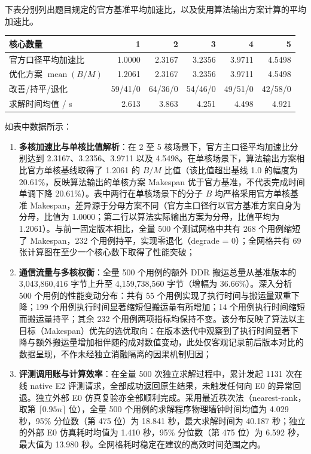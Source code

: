 \documentclass[anonymous,notoc]{gmcm2026}
\providecommand{\tightlist}{\setlength{\itemsep}{0pt}\setlength{\parskip}{0pt}}
\begin{document}
下表分别列出题目规定的官方基准平均加速比，以及使用算法输出方案计算的平均加速比。

\begin{table}[!htbp]\centering\small

\begin{tabularx}{\linewidth}{@{}Xrrrrr@{}}\toprule
核心数量 & 1 & 2 & 3 & 4 & 5 \\
\midrule
官方口径平均加速比 & 1.0000 & 2.3167 & 3.2356 & 3.9711 & 4.5498 \\
优化方案 $\operatorname{mean}(B/M)$ & 1.2061 & 2.3167 & 3.2356 & 3.9711 & 4.5498 \\
改善/持平/退化 & 59/41/0 & 64/36/0 & 54/46/0 & 49/51/0 & 42/58/0 \\
求解时间均值 / s & 2.613 & 3.863 & 4.251 & 4.498 & 4.921 \\
\bottomrule\end{tabularx}\end{table}

如表中数据所示：

\begin{enumerate}
\def\labelenumi{\arabic{enumi}.}
\tightlist
\item
  \textbf{多核加速比与单核比值解析}：在 2 至 5 核场景下，官方主口径平均加速比分别达到 2.3167、3.2356、3.9711 以及 4.5498。在单核场景下，算法输出方案相比官方单核基线取得了 1.2061 的 \(B/M\) 比值（该比值超出基线 1.0 的幅度为 20.61\%，反映算法输出的单核方案 Makespan 优于官方基准，不代表完成时间单调下降 20.61\%）。表中两行在单核场景下的分子 \(B\) 均严格采用官方单核基准 Makespan，差异源于分母方案不同（官方主口径行以官方基准方案自身为分母，比值为 1.0000；第二行以算法实际输出方案为分母，比值平均为 1.2061）。与前一固定版本相比，全量 500 个测试网格中共有 268 个用例缩短了 Makespan，232 个用例持平，实现零退化（degrade = 0）；全网格共有 69 张计算图在至少一个核心数下取得了性能突破；
\item
  \textbf{通信流量与多核权衡}：全量 500 个用例的额外 DDR 搬运总量从基准版本的 3,043,860,416 字节上升至 4,159,738,560 字节（增幅为 36.66\%）。深入分析 500 个用例的性能变动分布：共有 55 个用例实现了执行时间与搬运量双重下降；199 个用例执行时间显著缩短但搬运量有所增加；14 个用例执行时间缩短而搬运量持平；其余 232 个用例两项指标均保持不变。该分布反映了算法以主目标（Makespan）优先的选优取向：在版本迭代中观察到了执行时间显著下降与额外搬运量增加相伴随的成对数值变动，此处仅客观记录前后版本对比的数据呈现，不作未经独立消融隔离的因果机制归因；
\item
  \textbf{评测调用账与计算效率}：在全量 500 次独立求解过程中，累计发起 1131 次在线 native E2 评测请求，全部成功返回原生结果，未触发任何向 E0 的异常回退。独立外部 E0 仿真复验亦全部顺利完成。采用最近秩次法（nearest-rank，取第 \(\lceil 0.95n \rceil\) 位），全量 500 个用例的求解程序物理墙钟时间均值为 4.029 秒，95\% 分位数（第 475 位）为 18.841 秒，最大求解时间为 40.187 秒；独立的外部 E0 仿真耗时均值为 1.410 秒，95\% 分位数（第 475 位）为 6.592 秒，最大值为 13.980 秒。全网格耗时稳定在建议的高效时间范围之内。
\end{enumerate}
\end{document}
